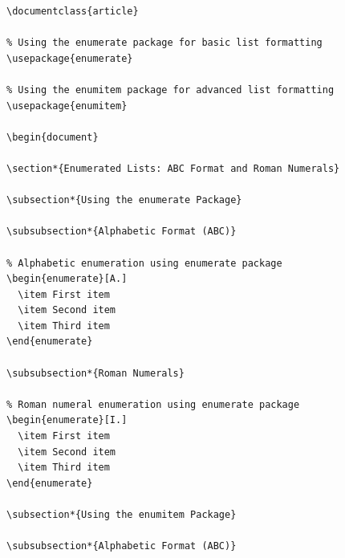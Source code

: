 \documentclass{article}
\begin{document}
\begin{verbatim}
\documentclass{article}

% Using the enumerate package for basic list formatting
\usepackage{enumerate}

% Using the enumitem package for advanced list formatting
\usepackage{enumitem}

\begin{document}

\section*{Enumerated Lists: ABC Format and Roman Numerals}

\subsection*{Using the enumerate Package}

\subsubsection*{Alphabetic Format (ABC)}

% Alphabetic enumeration using enumerate package
\begin{enumerate}[A.]
  \item First item
  \item Second item
  \item Third item
\end{enumerate}

\subsubsection*{Roman Numerals}

% Roman numeral enumeration using enumerate package
\begin{enumerate}[I.]
  \item First item
  \item Second item
  \item Third item
\end{enumerate}

\subsection*{Using the enumitem Package}

\subsubsection*{Alphabetic Format (ABC)}


\end{verbatim}
\end{document}
